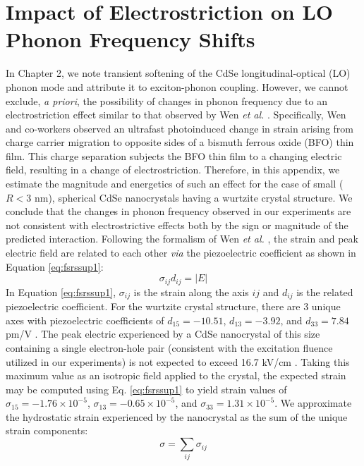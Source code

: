 \section{Impact of Electrostriction on LO Phonon Frequency Shifts} 
In Chapter 2, we note transient softening of the CdSe longitudinal-optical (LO) phonon mode and attribute it to exciton-phonon coupling. However, we cannot exclude, \emph{a priori}, the possibility of changes in phonon frequency due to an electrostriction effect similar to that observed by Wen \emph{et al.} \cite{wen2013electronic}. Specifically, Wen and co-workers observed an ultrafast photoinduced change in strain arising from charge carrier migration to opposite sides of a bismuth ferrous oxide (BFO) thin film. This charge separation subjects the BFO thin film to a changing electric field, resulting in a change of electrostriction. Therefore, in this appendix, we estimate the magnitude and energetics of such an effect for the case of small ($R < 3$ nm), spherical CdSe nanocrystals having a wurtzite crystal structure. We conclude that the changes in phonon frequency observed in our experiments are not consistent with electrostrictive effects both by the sign or magnitude of the predicted interaction. Following the formalism of Wen \emph{et al.} \cite{wen2013electronic}, the strain and peak electric field are related to each other \emph{via} the piezoelectric coefficient as shown in Equation \ref{eq:fsrssup1}:
\begin{equation}\label{eq:fsrssup1}
\sigma_{ij}d_{ij} = |E|
\end{equation}
In Equation \ref{eq:fsrssup1}, $\sigma_{ij}$ is the strain along the axis $ij$ and $d_{ij}$ is the related piezoelectric coefficient. For the wurtzite crystal structure, there are 3 unique axes with piezoelectric coefficients of $d_{15} = -10.51$, $d_{13} = -3.92$, and $d_{33} = 7.84$ pm/V \cite{adachi2009properties}. The peak electric experienced by a CdSe nanocrystal of this size containing a single electron-hole pair (consistent with the excitation fluence utilized in our experiments) is not expected to exceed 16.7 kV/cm \cite{billaud2009stark}. Taking this maximum value as an isotropic field applied to the crystal, the expected strain may be computed using Eq. \ref{eq:fsrssup1} to yield strain values of $\sigma_{15} = -1.76 \times 10^{-5}$, $\sigma_{13} = -0.65 \times 10^{-5}$, and $\sigma_{33} = 1.31 \times 10^{-5}$. We approximate the hydrostatic strain experienced by the nanocrystal as the sum of the unique strain components:
\begin{equation}\label{eq:fsrssup2}
\sigma = \sum_{ij} \sigma_{ij}
\end{equation}

